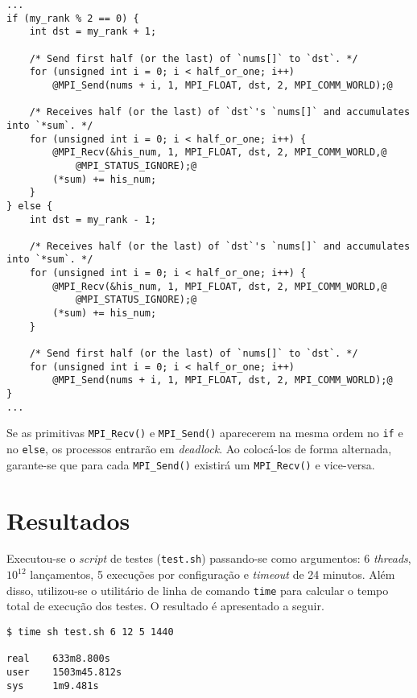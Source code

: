 \documentclass[12pt,a4paper]{article}
\begin{document}
\begin{minipage}{\linewidth}
\begin{lstlisting}[frame=single, style=c, label={code:deadlock},
    caption={Ordem das primitivas MPI\_Send() e MPI\_Recv() na função \texttt{reduce\_sumtree()}.}]
...
if (my_rank % 2 == 0) {
    int dst = my_rank + 1;

    /* Send first half (or the last) of `nums[]` to `dst`. */
    for (unsigned int i = 0; i < half_or_one; i++)
        @MPI_Send(nums + i, 1, MPI_FLOAT, dst, 2, MPI_COMM_WORLD);@

    /* Receives half (or the last) of `dst`'s `nums[]` and accumulates into `*sum`. */
    for (unsigned int i = 0; i < half_or_one; i++) {
        @MPI_Recv(&his_num, 1, MPI_FLOAT, dst, 2, MPI_COMM_WORLD,@
            @MPI_STATUS_IGNORE);@
        (*sum) += his_num;
    }
} else {
    int dst = my_rank - 1;

    /* Receives half (or the last) of `dst`'s `nums[]` and accumulates into `*sum`. */
    for (unsigned int i = 0; i < half_or_one; i++) {
        @MPI_Recv(&his_num, 1, MPI_FLOAT, dst, 2, MPI_COMM_WORLD,@
            @MPI_STATUS_IGNORE);@
        (*sum) += his_num;
    }

    /* Send first half (or the last) of `nums[]` to `dst`. */
    for (unsigned int i = 0; i < half_or_one; i++)
        @MPI_Send(nums + i, 1, MPI_FLOAT, dst, 2, MPI_COMM_WORLD);@
}
...
\end{lstlisting}
\end{minipage}

Se as primitivas \texttt{MPI\_Recv()} e \texttt{MPI\_Send()} aparecerem na mesma
ordem no \texttt{if} e no \texttt{else}, os processos entrarão em
\textit{deadlock}. Ao colocá-los de forma alternada, garante-se que para cada
\texttt{MPI\_Send()} existirá um \texttt{MPI\_Recv()} e vice-versa.


\section{Resultados}
\label{sec:resultados}
Executou-se o \textit{script} de testes (\texttt{test.sh}) passando-se como
argumentos: 6 \textit{threads}, $10^{12}$ lançamentos, 5 execuções por
configuração e \textit{timeout} de 24 minutos. Além disso, utilizou-se o
utilitário de linha de comando \texttt{time} para calcular o tempo total de
execução dos testes. O resultado é apresentado a seguir.

\begin{verbatim}
$ time sh test.sh 6 12 5 1440

real    633m8.800s
user    1503m45.812s
sys     1m9.481s
\end{verbatim}
\end{document}
